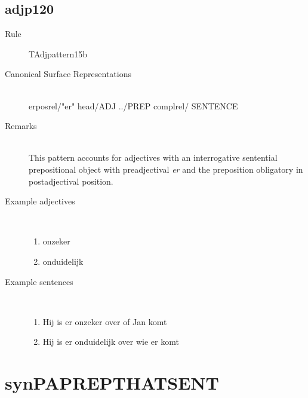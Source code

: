   \subsection{adjp120}
\begin{description}
  \item [Rule] TAdjpattern15b
  \item [Canonical Surface Representations] \mbox{}\\
erposrel/"er" head/ADJ ../PREP complrel/
SENTENCE
  \item [Remarks] \mbox{}\\ This pattern accounts for adjectives with an interrogative
 sentential 
prepositional object with preadjectival {\em er} and the preposition 
obligatory in postadjectival position. 

  \item [Example adjectives] \mbox{}\\
\begin{enumerate}
  \item onzeker 
  \item onduidelijk
\end{enumerate}
  \item [Example sentences]\mbox{}\\
\begin{enumerate}
  \item Hij is er onzeker over of Jan komt
  \item Hij is er onduidelijk over wie er komt
\end{enumerate}

\end{description}
\newpage
\section{synPAPREPTHATSENT}
